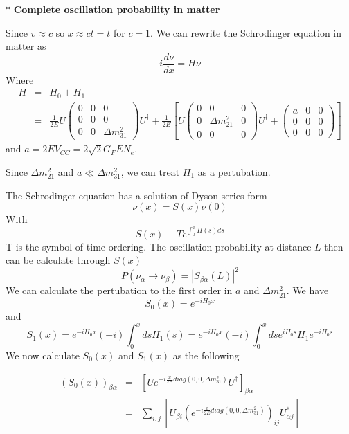 \documentclass[a4 paper,12pt]{report}%
\begin{document}
$*$ \textbf{Complete oscillation probability in matter}\par
Since $v \approx c$ so $x \approx ct = t$ for $c =1$. We can rewrite the Schrodinger equation in matter as
$$i\frac{d\nu}{dx} = H\nu$$
Where
 \begin{eqnarray}\label{62}\nonumber
H &=& H_0 + H_1\\ \nonumber
 &=&  \frac{1}{2E}U\left(\begin{array}{ccc} 0&0&0\\0&0&0\\ 0&0& \Delta m^2_{31}\end{array}\right)U^\dagger + 
 \frac{1}{2E}\left[U\left(\begin{array}{ccc} 0&0&0\\0&\Delta m^2_{21}&0\\ 0&0&0\end{array} \right)U^\dagger + \left(\begin{array}{ccc} a&0&0\\0&0&0\\ 0&0&0 \end{array}\right)\right]
\end{eqnarray} 
and $a = 2EV_{CC} = 2\sqrt{2}G_FEN_e$.\par
Since $\Delta m^2_{21}$ and $ a \ll \Delta m^2_{31}$, we can treat $H_1$ as a pertubation.\par
The Schrodinger equation has a solution of Dyson series form 
\begin{equation}\label{63}
\nu(x) =S(x)\nu(0)
\end{equation}
With $$S(x) \equiv Te^{\int^x_0H(s)ds}$$
T is the symbol of time ordering. The oscillation probability at distance $L$ then can be calculate through $S(x)$
\begin{equation}\label{64}
P(\nu_{\alpha} \rightarrow \nu_{\beta}) = |S_{\beta\alpha}(L)|^2
\end{equation}
We can calculate the pertubation to the first order in $a$ and $\Delta m^2_{21}$. We have
$$S_0(x) = e^{-iH_0x}$$
and
$$S_1(x) = e^{-iH_0x}(-i)\int^x_0dsH_1(s) =  e^{-iH_0x}(-i)\int^x_0dse^{iH_0s}H_1e^{-iH_0s}$$
We now calculate $S_0(x)$ and $S_1(x)$ as the following\par
 \begin{eqnarray}\nonumber
(S_0(x))_{\beta\alpha} &=& \left[ Ue^{-i\frac{x}{2E}diag(0,0,\Delta m^2_{31})}U^\dagger\right]_{\beta\alpha}\\ \nonumber
&=& \sum_{i,j}\left[ U_{\beta i}\left(e^{-i\frac{x}{2E}diag(0,0,\Delta m^2_{31})}\right)_{ij}U^*_{\alpha j}\right]
\end{eqnarray} 
\end{document}
